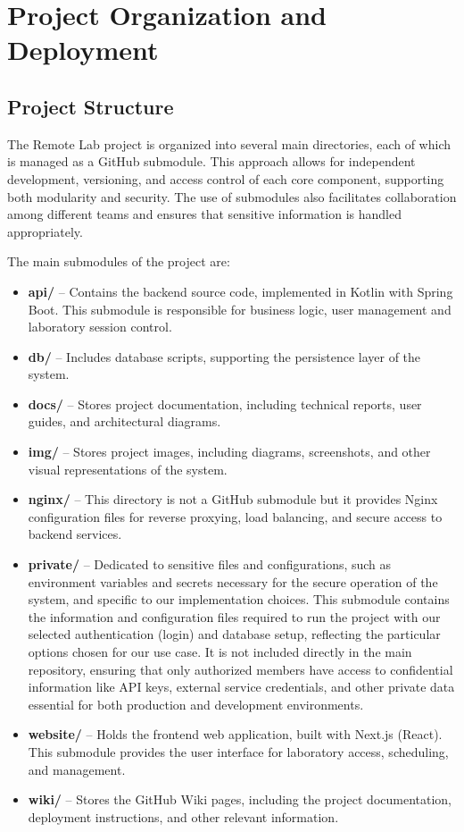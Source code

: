 \chapter{Project Organization and Deployment} \label{cap:project_org_deployment}

\section{Project Structure}

The Remote Lab project is organized into several main directories, each of which is managed as a GitHub submodule. This approach allows for independent development, versioning, and access control of each core component, supporting both modularity and security. The use of submodules also facilitates collaboration among different teams and ensures that sensitive information is handled appropriately.

The main submodules of the project are:

\begin{itemize}
    \item \textbf{api/} -- Contains the backend source code, implemented in Kotlin with Spring Boot. This submodule is responsible for business logic, user management and laboratory session control.
    \item \textbf{db/} -- Includes database scripts, supporting the persistence layer of the system.
    \item \textbf{docs/} -- Stores project documentation, including technical reports, user guides, and architectural diagrams.
    \item \textbf{img/} -- Stores project images, including diagrams, screenshots, and other visual representations of the system.
    \item \textbf{nginx/} -- This directory is not a GitHub submodule but it provides Nginx configuration files for reverse proxying, load balancing, and secure access to backend services.
    \item \textbf{private/} -- Dedicated to sensitive files and configurations, such as environment variables and secrets necessary for the secure operation of the system, and specific to our implementation choices. This submodule contains the information and configuration files required to run the project with our selected authentication (login) and database setup, reflecting the particular options chosen for our use case. It is not included directly in the main repository, ensuring that only authorized members have access to confidential information like API keys, external service credentials, and other private data essential for both production and development environments.
    \item \textbf{website/} -- Holds the frontend web application, built with Next.js (React). This submodule provides the user interface for laboratory access, scheduling, and management.
    \item \textbf{wiki/} -- Stores the GitHub Wiki pages, including the project documentation, deployment instructions, and other relevant information.
\end{itemize}

